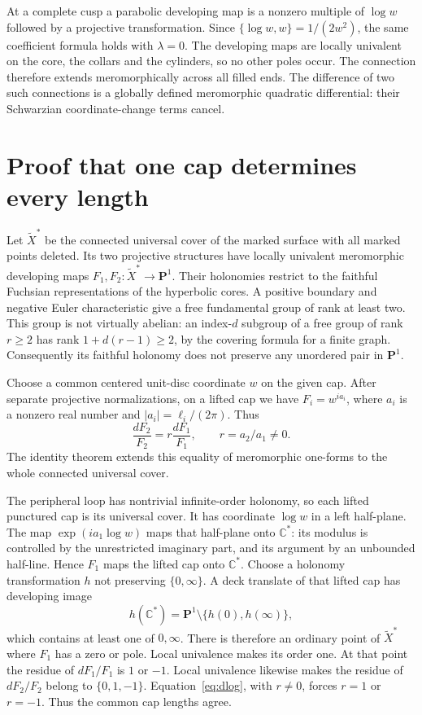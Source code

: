 \documentclass[11pt,a4paper]{article}
\theoremstyle{definition}
\newcommand{\C}{\mathbb C}
\begin{document}
At a complete cusp a parabolic developing map is a nonzero multiple of $\log w$ followed by a projective transformation. Since $\{\log w,w\}=1/(2w^2)$, the same coefficient formula holds with $\lambda=0$. The developing maps are locally univalent on the core, the collars and the cylinders, so no other poles occur. The connection therefore extends meromorphically across all filled ends. The difference of two such connections is a globally defined meromorphic quadratic differential: their Schwarzian coordinate-change terms cancel.

\section{Proof that one cap determines every length}
Let $\widetilde X^*$ be the connected universal cover of the marked surface with all marked points deleted. Its two projective structures have locally univalent meromorphic developing maps $F_1,F_2:\widetilde X^*\to\mathbf P^1$. Their holonomies restrict to the faithful Fuchsian representations of the hyperbolic cores. A positive boundary and negative Euler characteristic give a free fundamental group of rank at least two. This group is not virtually abelian: an index-$d$ subgroup of a free group of rank $r\ge2$ has rank $1+d(r-1)\ge2$, by the covering formula for a finite graph. Consequently its faithful holonomy does not preserve any unordered pair in $\mathbf P^1$.

Choose a common centered unit-disc coordinate $w$ on the given cap. After separate projective normalizations, on a lifted cap we have $F_i=w^{i a_i}$, where $a_i$ is a nonzero real number and $|a_i|=\ell_i/(2\pi)$. Thus
\begin{equation}\label{eq:dlog}
 \frac{dF_2}{F_2}=r\frac{dF_1}{F_1},\qquad r=a_2/a_1\ne0.
\end{equation}
The identity theorem extends this equality of meromorphic one-forms to the whole connected universal cover.

The peripheral loop has nontrivial infinite-order holonomy, so each lifted punctured cap is its universal cover. It has coordinate $\log w$ in a left half-plane. The map $\exp(i a_1\log w)$ maps that half-plane onto $\C^*$: its modulus is controlled by the unrestricted imaginary part, and its argument by an unbounded half-line. Hence $F_1$ maps the lifted cap onto $\C^*$. Choose a holonomy transformation $h$ not preserving $\{0,\infty\}$. A deck translate of that lifted cap has developing image
\[
 h(\C^*)=\mathbf P^1\setminus\{h(0),h(\infty)\},
\]
which contains at least one of $0,\infty$. There is therefore an ordinary point of $\widetilde X^*$ where $F_1$ has a zero or pole. Local univalence makes its order one. At that point the residue of $dF_1/F_1$ is $1$ or $-1$. Local univalence likewise makes the residue of $dF_2/F_2$ belong to $\{0,1,-1\}$. Equation~\eqref{eq:dlog}, with $r\ne0$, forces $r=1$ or $r=-1$. Thus the common cap lengths agree.
\end{document}
